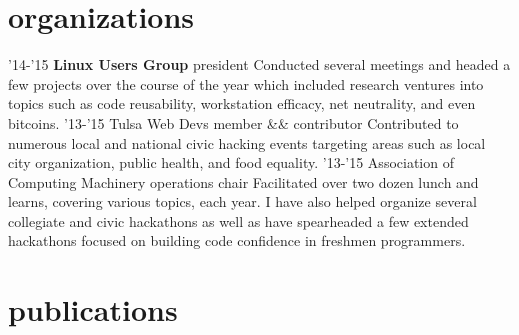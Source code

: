 \documentclass[print]{friggeri-cv}
\begin{document}
  \section{organizations}

    \begin{entrylist}
      \entry
        {'14-'15}
        {\textbf{Linux Users Group}}
        {president}
        {Conducted several meetings and headed a few projects over the course of the year which included research ventures into topics such as code reusability, workstation efficacy, net neutrality, and even bitcoins.}
      \entry
        {'13-'15}
        {Tulsa Web Devs}
        {member \&\& contributor}
        {Contributed to numerous local and national civic hacking events targeting areas such as local city organization, public health, and food equality.}
      \entry
        {'13-'15}
        {Association of Computing Machinery}
        {operations chair}
        {Facilitated over two dozen lunch and learns, covering various topics, each year. I have also helped organize several collegiate and civic hackathons as well as have spearheaded a few extended hackathons focused on building code confidence in freshmen programmers.}
    \end{entrylist}

  \section{publications}
\end{document}
